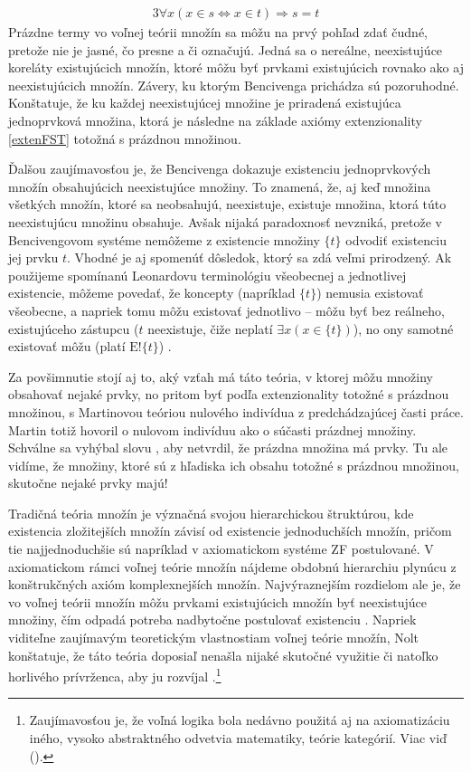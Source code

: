 \documentclass[12pt, letterpaper]{article}
\begin{document}
\begin{alignat}{3}
 	\forall x (x \in s \iff x \in t) \Rightarrow s = t \label{extenFST}
\end{alignat}
\noindent Prázdne termy vo voľnej teórii množín sa môžu na prvý pohľad zdať čudné, pretože nie je jasné, čo presne a či označujú. Jedná sa o nereálne, neexistujúce koreláty existujúcich množín, ktoré môžu byť prvkami existujúcich rovnako ako aj neexistujúcich množín. Závery, ku ktorým Bencivenga prichádza sú pozoruhodné. Konštatuje, že ku každej neexistujúcej množine je priradená existujúca jednoprvková množina, ktorá je následne na základe axiómy extenzionality \ref{extenFST} totožná s prázdnou množinou.\par
Ďalšou zaujímavosťou je, že Bencivenga dokazuje existenciu jednoprvkových množín obsahujúcich neexistujúce množiny. To znamená, že, aj keď množina všetkých množín, ktoré sa neobsahujú, neexistuje, existuje množina, ktorá túto neexistujúcu množinu obsahuje. Avšak nijaká paradoxnosť nevzniká, pretože v Bencivengovom systéme nemôžeme z existencie množiny $\{t\}$ odvodiť existenciu jej prvku $t$. Vhodné je aj spomenúť dôsledok, ktorý sa zdá veľmi prirodzený. Ak použijeme spomínanú Leonardovu terminológiu všeobecnej a jednotlivej existencie, môžeme povedať, že koncepty (napríklad $\{t\}$) nemusia existovať všeobecne, a napriek tomu môžu existovať jednotlivo -- môžu byť bez reálneho, existujúceho zástupcu ($t$ neexistuje, čiže neplatí $\exists x(x \in \{t\})$), no ony samotné existovať môžu (platí $\text{E}!\{t\}$) \parencites[9]{BencivengaTM}[1045--1046]{Nolt2007}.\par
Za povšimnutie stojí aj to, aký vzťah má táto teória, v ktorej môžu množiny obsahovať nejaké prvky, no pritom byť podľa extenzionality totožné s prázdnou množinou, s Martinovou teóriou nulového indivídua z predchádzajúcej časti práce. Martin totiž hovoril o nulovom indivíduu ako o súčasti prázdnej množiny. Schválne sa vyhýbal slovu , aby netvrdil, že prázdna množina má prvky. Tu ale vidíme, že množiny, ktoré sú z hľadiska ich obsahu totožné s prázdnou množinou, skutočne nejaké prvky majú!\par
Tradičná teória množín je význačná svojou hierarchickou štruktúrou, kde existencia zložitejších množín závisí od existencie jednoduchších množín, pričom tie najjednoduchšie sú napríklad v axiomatickom systéme ZF postulované. V axiomatickom rámci voľnej teórie množín nájdeme obdobnú hierarchiu plynúcu z konštrukčných axióm komplexnejších množín. Najvýraznejším rozdielom ale je, že vo voľnej teórii množín môžu prvkami existujúcich množín byť neexistujúce množiny, čím odpadá potreba nadbytočne postulovať existenciu \parencites[13--14]{BencivengaTM}. Napriek viditeľne zaujímavým teoretickým vlastnostiam voľnej teórie množín, Nolt konštatuje, že táto teória doposiaľ nenašla nijaké skutočné využitie či natoľko horlivého prívrženca, aby ju rozvíjal \parencites[1046]{Nolt2007}.\footnote{Zaujímavosťou je, že voľná logika bola nedávno použitá aj na axiomatizáciu iného, vysoko abstraktného odvetvia matematiky, teórie kategórií. Viac viď \citeauthor{benzmüller2018axiomatizing} (\citeyear{benzmüller2018axiomatizing}).}
\end{document}
